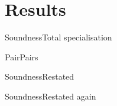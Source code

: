 \documentclass{article}
\begin{document}
\section{Results}\label{sec:results}
\begin{leanlemma}{Soundness}{Total specialisation}
\end{leanlemma}
\begin{leandef}{Pair}{Pairs}
\end{leandef}
\begin{display}
\end{display}
\appendix\label{app:proofs}
\begin{leanlemma}{Soundness}{Restated}
\end{leanlemma}
\begin{leanlemma}{Soundness}{Restated again}
\end{leanlemma}
\end{document}
